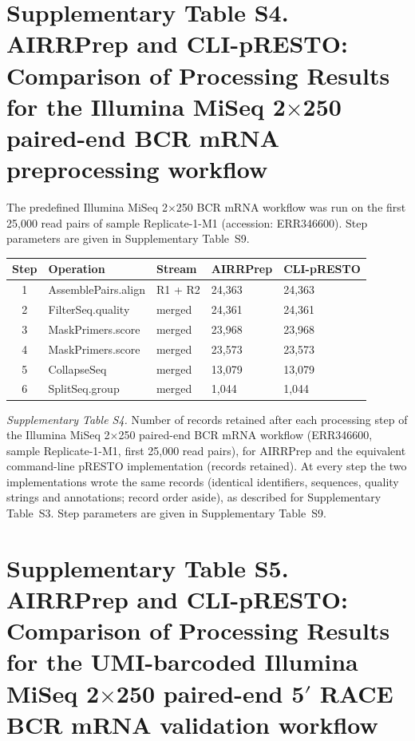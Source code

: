 \documentclass[11pt]{article}
\begin{document}
\clearpage
\section*{Supplementary Table S4. AIRRPrep and CLI-pRESTO: Comparison of Processing Results for the Illumina MiSeq 2$\times$250 paired-end BCR mRNA preprocessing workflow}

The predefined Illumina MiSeq 2$\times$250 BCR mRNA workflow was run on the
first 25,000 read pairs of sample Replicate-1-M1 (accession: ERR346600). Step
parameters are given in Supplementary Table~S9.

\begin{table}[htbp]
\centering
\small
\begin{tabular}{cllll}
\toprule
\textbf{Step} & \textbf{Operation} & \textbf{Stream} & \textbf{AIRRPrep} & \textbf{CLI-pRESTO} \\
\midrule

1
& AssemblePairs.align
& R1 + R2
& 24,363
& 24,363 \\

2
& FilterSeq.quality
& merged
& 24,361
& 24,361 \\

3
& MaskPrimers.score
& merged
& 23,968
& 23,968 \\

4
& MaskPrimers.score
& merged
& 23,573
& 23,573 \\

5
& CollapseSeq
& merged
& 13,079
& 13,079 \\

6
& SplitSeq.group
& merged
& 1,044
& 1,044 \\

\bottomrule
\end{tabular}
\end{table}

{\small\textit{Supplementary Table S4.} Number of records retained after each
processing step of the Illumina MiSeq 2$\times$250 paired-end BCR mRNA
workflow (ERR346600, sample Replicate-1-M1, first 25,000 read pairs), for
AIRRPrep and the equivalent command-line pRESTO implementation (records
retained). At every step the two implementations wrote the same records
(identical identifiers, sequences, quality strings and annotations; record
order aside), as described for Supplementary Table~S3. Step parameters are
given in Supplementary Table~S9.\par}

\clearpage
\section*{Supplementary Table S5. AIRRPrep and CLI-pRESTO: Comparison of Processing Results for the UMI-barcoded Illumina MiSeq 2$\times$250 paired-end 5$'$ RACE BCR mRNA validation workflow}
\end{document}
